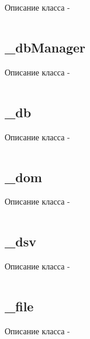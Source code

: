 \documentclass[a4paper, 14pt]{extarticle}
\begin{document}
Описание класса  -
\begin{lstlisting}[numbers=none]

\end{lstlisting}

\subsection{{\color{orange} \_dbManager}}

Описание класса  -
\begin{lstlisting}[numbers=none]

\end{lstlisting}

\subsection{{\color{orange} \_db}}

Описание класса  -
\begin{lstlisting}[numbers=none]

\end{lstlisting}

\subsection{{\color{orange} \_dom}}

Описание класса  -
\begin{lstlisting}[numbers=none]

\end{lstlisting}

\subsection{{\color{orange} \_dsv}}

Описание класса  -
\begin{lstlisting}[numbers=none]

\end{lstlisting}

\subsection{{\color{orange} \_file}}

Описание класса  -
\begin{lstlisting}[numbers=none]

\end{lstlisting}
\end{document}
